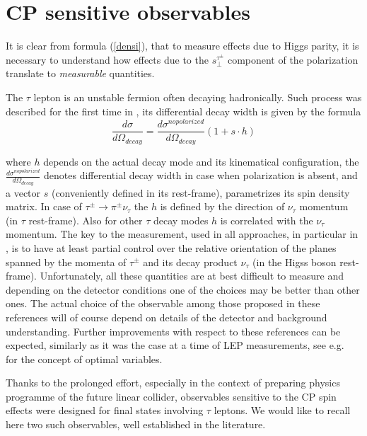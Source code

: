 \documentclass[12pt]{article}
\begin{document}
\section {CP sensitive observables}
\label{sec:CPsensitive}

It is clear from formula (\ref{densi}), that to measure effects due to 
Higgs parity, it is necessary to understand how 
effects due to the $s^{\tau^{\pm}}_{\perp}$ component of the polarization translate
to {\it measurable} quantities.


The $\tau$ lepton is an unstable fermion often decaying hadronically. 
Such process was described for the first time in \cite{Tsai:1971vv},  its
differential decay width is given by the formula
\begin{equation}\label{eq:3}
\frac{d\sigma}{d\Omega_{decay}}=\frac{d\sigma^{no polarized}}{d\Omega_{decay}}(1+{s}\cdot{h}) 
\end{equation}

where $h$ depends on the actual decay mode and its kinematical
configuration, the $\frac{d\sigma^{no polarized}}{d\Omega_{decay}}$ denotes
differential decay width in case when polarization is absent, and a vector $s$ (conveniently 
defined in its rest-frame), parametrizes its spin density
matrix.
In case of $\tau^\pm \to \pi^\pm \nu_\tau$ the $h$ 
is defined by the direction of $\nu_\tau$ momentum (in $\tau$ rest-frame). 
Also for other 
$\tau$ decay modes $h$ is correlated with the  $\nu_\tau$ momentum.
The key to the measurement, used in all approaches, in particular in
\cite{Kramer:1994jn,Desch:2003rw,Bower:2002zx,Desch:2003mw,Rouge:2005iy},
is to have at least partial control over the
relative orientation of the  planes spanned by the momenta of $\tau^\pm$ 
and its decay product $\nu_\tau$ (in the Higss boson rest-frame).
Unfortunately, all these quantities are at best difficult to measure and depending
on the detector conditions one of the choices may be better than other ones. 
The actual choice of the observable among those proposed in these references
will of course depend  on details of the  detector and background understanding.
Further improvements with respect to these references can be expected, similarly as it was
the case  at a time of LEP measurements, see e.g.~\cite{Davier:1992nw} for the concept of optimal variables.



Thanks to the prolonged effort, especially in the context of preparing physics programme 
of the future linear collider, observables sensitive to the CP spin effects were designed for 
final states involving $\tau$ leptons. We would like to recall here two such observables, 
well established in the literature. 
\end{document}
